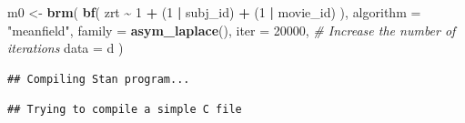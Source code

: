 \documentclass[
]{article}
\newenvironment{Shaded}{\begin{snugshade}}{\end{snugshade}}
\newcommand{\AttributeTok}[1]{\textcolor[rgb]{0.13,0.29,0.53}{#1}}
\newcommand{\CommentTok}[1]{\textcolor[rgb]{0.56,0.35,0.01}{\textit{#1}}}
\newcommand{\DecValTok}[1]{\textcolor[rgb]{0.00,0.00,0.81}{#1}}
\newcommand{\FunctionTok}[1]{\textcolor[rgb]{0.13,0.29,0.53}{\textbf{#1}}}
\newcommand{\NormalTok}[1]{#1}
\newcommand{\OtherTok}[1]{\textcolor[rgb]{0.56,0.35,0.01}{#1}}
\newcommand{\SpecialCharTok}[1]{\textcolor[rgb]{0.81,0.36,0.00}{\textbf{#1}}}
\newcommand{\StringTok}[1]{\textcolor[rgb]{0.31,0.60,0.02}{#1}}
\begin{document}
\begin{Shaded}
\begin{Highlighting}[]
\NormalTok{m0 }\OtherTok{\textless{}{-}} \FunctionTok{brm}\NormalTok{(}
  \FunctionTok{bf}\NormalTok{(}
\NormalTok{    zrt }\SpecialCharTok{\textasciitilde{}} \DecValTok{1} \SpecialCharTok{+}\NormalTok{ (}\DecValTok{1} \SpecialCharTok{|}\NormalTok{ subj\_id) }\SpecialCharTok{+}\NormalTok{ (}\DecValTok{1} \SpecialCharTok{|}\NormalTok{ movie\_id)}
\NormalTok{  ), }
  \AttributeTok{algorithm =} \StringTok{"meanfield"}\NormalTok{,}
  \AttributeTok{family =} \FunctionTok{asym\_laplace}\NormalTok{(),}
  \AttributeTok{iter =} \DecValTok{20000}\NormalTok{, }\CommentTok{\# Increase the number of iterations}
  \AttributeTok{data =}\NormalTok{ d}
\NormalTok{)}
\end{Highlighting}
\end{Shaded}

\begin{verbatim}
## Compiling Stan program...
\end{verbatim}

\begin{verbatim}
## Trying to compile a simple C file
\end{verbatim}
\end{document}
